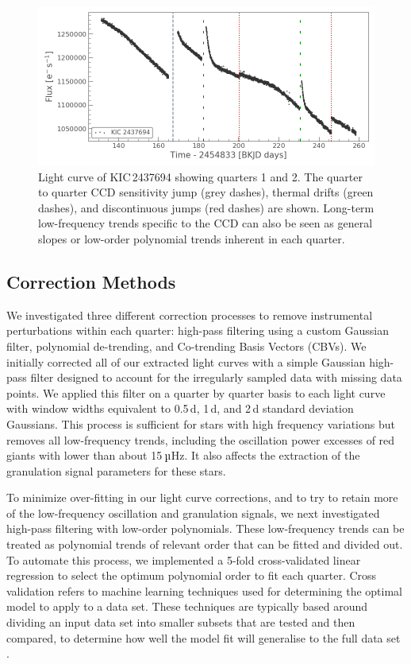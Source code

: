 \begin{figure}
    \centering
    \includegraphics[width=\linewidth]{Chapter5/lc12_systematics.png}
    \caption[Light curve of KIC 2437694 showing quarters 1 and 2]{Light curve of KIC\,2437694 showing quarters 1 and 2. The quarter to quarter CCD sensitivity jump (grey dashes), thermal drifts (green dashes), and discontinuous jumps (red dashes) are shown. Long-term low-frequency trends specific to the CCD can also be seen as general slopes or low-order polynomial trends inherent in each quarter.}
    \label{fig:lc_system}
\end{figure}

\subsection{Correction Methods}

We investigated three different correction processes to remove instrumental perturbations within each quarter: high-pass filtering using a custom Gaussian filter, polynomial de-trending, and Co-trending Basis Vectors (CBVs). We initially corrected all of our extracted light curves with a simple Gaussian high-pass filter designed to account for the irregularly sampled data with missing data points. We applied this filter on a quarter by quarter basis to each light curve with window widths equivalent to 0.5\,d, 1\,d, and 2\,d standard deviation Gaussians. This process is sufficient for stars with high frequency variations but removes all low-frequency trends, including the oscillation power excesses of red giants with \numax{} lower than about 15\,$\micro$Hz. It also affects the extraction of the granulation signal parameters for these stars.

To minimize over-fitting in our light curve corrections, and to try to retain more of the low-frequency oscillation and granulation signals, we next investigated high-pass filtering with low-order polynomials. These low-frequency trends can be treated as polynomial trends of relevant order that can be fitted and divided out. To automate this process, we implemented a 5-fold cross-validated linear regression to select the optimum polynomial order to fit each quarter. Cross validation refers to machine learning techniques used for determining the optimal model to apply to a data set. These techniques are typically based around dividing an input data set into smaller subsets that are tested and then compared, to determine how well the model fit will generalise to the full data set \citep{mosteller1965data}.

